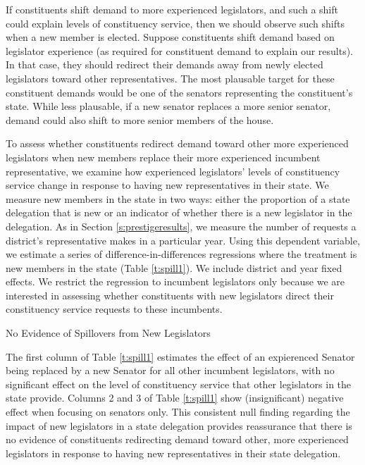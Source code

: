 \documentclass[12pt]{article}
\begin{document}
If constituents shift demand to more experienced legislators, and such a shift could explain levels of constituency service, then we should observe such shifts when a new member is elected. Suppose constituents shift demand based on legislator experience (as required for constituent demand to explain our results). In that case, they should redirect their demands away from newly elected legislators toward other representatives. The most plausable target for these constituent demands would be one of the senators representing the constituent's state. While less plausable, if a new senator replaces a more senior senator, demand could also shift to more senior members of the house.

To assess whether constituents redirect demand toward other more experienced legislators when new members replace their more experienced incumbent representative, we examine how experienced legislators' levels of constituency service change in response to having new representatives in their state. We measure new members in the state in two ways: either the proportion of a state delegation that is new or an indicator of whether there is a new legislator in the delegation. As in Section \ref{s:prestigeresults}, we measure the number of requests a district's representative makes in a particular year. Using this dependent variable, we estimate a series of difference-in-differences regressions where the treatment is new members in the state (Table \ref{t:spill1}). We include district and year fixed effects. We restrict the regression to incumbent legislators only because we are interested in assessing whether constituents with new legislators direct their constituency service requests to these incumbents. 
   
\begin{table}[hbt!]
\caption{No Evidence of Spillovers from New Legislators} \label{t:spill1}

\begin{minipage}{\textwidth}
\begin{center}

\end{center}
\end{minipage}
\end{table}

The first column of Table \ref{t:spill1} estimates the effect of an expierenced Senator being replaced by a new Senator for all other incumbent legislators, with no significant effect on the level of constituency service that other legislators in the state provide. Columns 2 and 3 of Table \ref{t:spill1} show (insignificant) negative effect when focusing on senators only. This consistent null finding regarding the impact of new legislators in a state delegation provides reassurance that there is no evidence of constituents redirecting demand toward other, more experienced legislators in response to having new representatives in their state delegation. %
\end{document}
